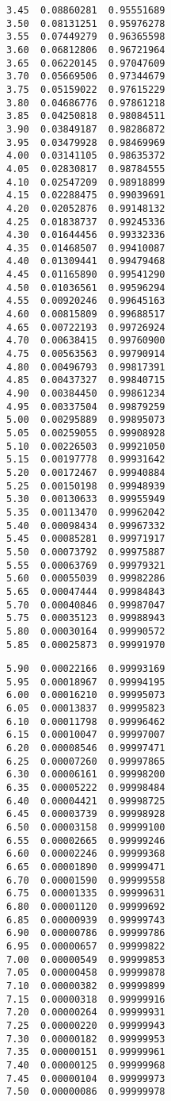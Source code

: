 \documentclass[10pt,reqno]{amsart}
\theoremstyle{plain}
\theoremstyle{definition}
\theoremstyle{remark}
\begin{document}
\begin{table}[tbp]
{\begin{minipage}{0.3\textwidth}
\begin{verbatim}
3.45  0.08860281  0.95551689
3.50  0.08131251  0.95976278
3.55  0.07449279  0.96365598
3.60  0.06812806  0.96721964
3.65  0.06220145  0.97047609
3.70  0.05669506  0.97344679
3.75  0.05159022  0.97615229
3.80  0.04686776  0.97861218
3.85  0.04250818  0.98084511
3.90  0.03849187  0.98286872
3.95  0.03479928  0.98469969
4.00  0.03141105  0.98635372
4.05  0.02830817  0.98784555
4.10  0.02547209  0.98918899
4.15  0.02288475  0.99039691
4.20  0.02052876  0.99148132
4.25  0.01838737  0.99245336
4.30  0.01644456  0.99332336
4.35  0.01468507  0.99410087
4.40  0.01309441  0.99479468
4.45  0.01165890  0.99541290
4.50  0.01036561  0.99596294
4.55  0.00920246  0.99645163
4.60  0.00815809  0.99688517
4.65  0.00722193  0.99726924
4.70  0.00638415  0.99760900
4.75  0.00563563  0.99790914
4.80  0.00496793  0.99817391
4.85  0.00437327  0.99840715
4.90  0.00384450  0.99861234
4.95  0.00337504  0.99879259
5.00  0.00295889  0.99895073
5.05  0.00259055  0.99908928
5.10  0.00226503  0.99921050
5.15  0.00197778  0.99931642
5.20  0.00172467  0.99940884
5.25  0.00150198  0.99948939
5.30  0.00130633  0.99955949
5.35  0.00113470  0.99962042
5.40  0.00098434  0.99967332
5.45  0.00085281  0.99971917
5.50  0.00073792  0.99975887
5.55  0.00063769  0.99979321
5.60  0.00055039  0.99982286
5.65  0.00047444  0.99984843
5.70  0.00040846  0.99987047
5.75  0.00035123  0.99988943
5.80  0.00030164  0.99990572
5.85  0.00025873  0.99991970
\end{verbatim}
\end{minipage}
\hfil
\begin{minipage}{0.3\textwidth}
\begin{verbatim}
5.90  0.00022166  0.99993169
5.95  0.00018967  0.99994195
6.00  0.00016210  0.99995073
6.05  0.00013837  0.99995823
6.10  0.00011798  0.99996462
6.15  0.00010047  0.99997007
6.20  0.00008546  0.99997471
6.25  0.00007260  0.99997865
6.30  0.00006161  0.99998200
6.35  0.00005222  0.99998484
6.40  0.00004421  0.99998725
6.45  0.00003739  0.99998928
6.50  0.00003158  0.99999100
6.55  0.00002665  0.99999246
6.60  0.00002246  0.99999368
6.65  0.00001890  0.99999471
6.70  0.00001590  0.99999558
6.75  0.00001335  0.99999631
6.80  0.00001120  0.99999692
6.85  0.00000939  0.99999743
6.90  0.00000786  0.99999786
6.95  0.00000657  0.99999822
7.00  0.00000549  0.99999853
7.05  0.00000458  0.99999878
7.10  0.00000382  0.99999899
7.15  0.00000318  0.99999916
7.20  0.00000264  0.99999931
7.25  0.00000220  0.99999943
7.30  0.00000182  0.99999953
7.35  0.00000151  0.99999961
7.40  0.00000125  0.99999968
7.45  0.00000104  0.99999973
7.50  0.00000086  0.99999978

\end{verbatim}
\end{minipage}}
\end{table}
\end{document}
